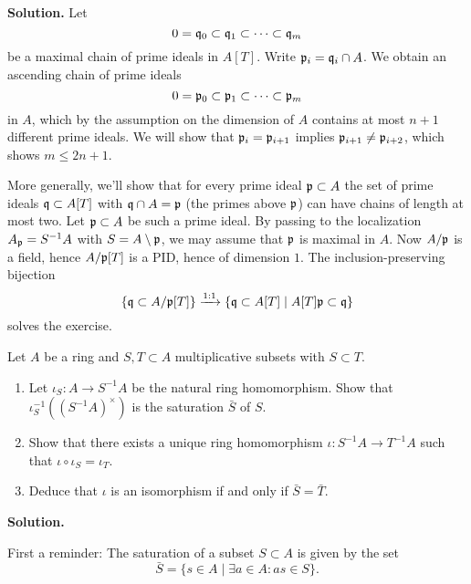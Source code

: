 \documentclass[a4paper,11pt]{article}
\begin{document}
\textbf{Solution.}
Let $$0 = \mathfrak{q}_0 \subset \mathfrak{q}_1 \subset \dots \subset \mathfrak{q}_m$$ be a maximal chain of 
prime ideals in $A[T]$. Write $\mathfrak{p}_i = \mathfrak{q}_i \cap A$. We obtain an ascending chain
of prime ideals 
\begin{equation*}
    0 = \mathfrak{p}_0 \subset \mathfrak{p}_1 \subset \dots \subset \mathfrak{p}_m
\end{equation*}
in $A$, which by the assumption on the dimension of $A$ contains at most $n+1$
different prime ideals. We will show that $\mathfrak{p}_i = \mathfrak{p}_{i+1}$ implies
$\mathfrak{p}_{i+1} \neq \mathfrak{p}_{i+2}$, which shows $m \leq 2n + 1$. 

More generally, we'll show that for every prime ideal $\mathfrak{p} \subset A$ the set of
prime ideals $\mathfrak{q} \subset A[T]$ with $\mathfrak{q} \cap A = \mathfrak{p}$ (the primes above
$\mathfrak{p}$) can have chains of length at most two. Let $\mathfrak{p} \subset A$ be such a prime
ideal. By passing to the localization $A_{\mathfrak{p}} = S^{-1} A$ with $S = A\setminus \mathfrak{p}$,
we may assume that $\mathfrak{p}$ is maximal in $A$. 
Now $A/\mathfrak{p}$ is a field, hence $A/\mathfrak{p}[T]$ is a PID, hence of dimension $1$. 
The inclusion-preserving bijection
\begin{equation*}
    \{\mathfrak{q} \subset A/\mathfrak{p}[T]\} \xrightarrow{1:1} \{\mathfrak{q} \subset A[T] \mid A[T]\mathfrak{p} \subset
    \mathfrak{q} \}
\end{equation*}
solves the exercise.

Let $A$ be a ring and $S, T \subset A$ multiplicative subsets with $S \subset T$. 
\begin{enumerate}
    \item Let $\iota_S : A \to S^{-1}A$ be the natural ring homomorphism. Show that 
        $\iota_S^{-1}((S^{-1} A)^\times)$ is the saturation $\bar S$ of $S$. 
    \item Show that there exists a unique ring homomorphism $\iota:  S^{-1}A \to
        T^{-1}A$ such that $\iota \circ \iota_S = \iota_T.$
    \item Deduce that $\iota$ is an isomorphism if and only if $\bar S = \bar T$. 
\end{enumerate}

\textbf{Solution.}

First a reminder: The saturation of a subset $S \subset A$ is given by the set
$$\bar S = \{s \in A \mid \exists a \in A : as \in S\}.$$
\end{document}
